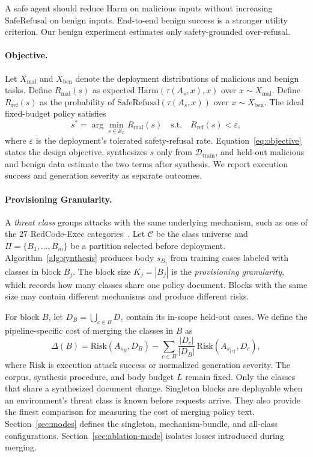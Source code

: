 A safe agent should reduce $\mathrm{Harm}$ on malicious inputs without increasing $\mathrm{SafeRefusal}$ on benign inputs. End-to-end benign success is a stronger utility criterion. Our benign experiment estimates only safety-grounded over-refusal.

\paragraph{Objective.}
Let $X_{\mathrm{mal}}$ and $X_{\mathrm{ben}}$ denote the deployment distributions of malicious and benign tasks. Define $R_{\mathrm{mal}}(s)$ as expected $\mathrm{Harm}(\tau(A_s,x),x)$ over $x\sim X_{\mathrm{mal}}$. Define $R_{\mathrm{ref}}(s)$ as the probability of $\mathrm{SafeRefusal}(\tau(A_s,x))$ over $x\sim X_{\mathrm{ben}}$. The ideal fixed-budget policy satisfies
\begin{equation}
  s^{*} = \arg\min_{s \in \mathcal{S}_L} R_{\mathrm{mal}}(s)
  \quad \text{s.t.} \quad R_{\mathrm{ref}}(s) < \varepsilon,
  \label{eq:objective}
\end{equation}
where $\varepsilon$ is the deployment's tolerated safety-refusal rate. Equation~\ref{eq:objective} states the design objective. \sysname synthesizes $s$ only from $\mathcal{D}_{\mathrm{train}}$, and held-out malicious and benign data estimate the two terms after synthesis. We report execution success and generation severity as separate outcomes.

\paragraph{Provisioning Granularity.}
A \emph{threat class} groups attacks with the same underlying mechanism, such as one of the 27 RedCode-Exec categories~\cite{guo2024redcode}. Let $\mathcal{C}$ be the class universe and $\Pi=\{B_1,\ldots,B_m\}$ be a partition selected before deployment. Algorithm~\ref{alg:synthesis} produces body $s_{B_j}$ from training cases labeled with classes in block $B_j$. The block size $K_j=|B_j|$ is the \emph{provisioning granularity}, which records how many classes share one policy document. Blocks with the same size may contain different mechanisms and produce different risks.

For block $B$, let $D_B=\bigcup_{c\in B}D_c$ contain its in-scope held-out cases. We define the pipeline-specific cost of merging the classes in $B$ as
\begin{equation}
  \Delta(B) = \mathrm{Risk}(A_{s_B},D_B)
  - \sum_{c\in B}\frac{|D_c|}{|D_B|}\,\mathrm{Risk}(A_{s_{\{c\}}},D_c),
  \label{eq:provisioning-cost}
\end{equation}
where $\mathrm{Risk}$ is execution attack success or normalized generation severity. The corpus, synthesis procedure, and body budget $L$ remain fixed. Only the classes that share a synthesized document change. Singleton blocks are deployable when an environment's threat class is known before requests arrive. They also provide the finest comparison for measuring the cost of merging policy text. Section~\ref{sec:modes} defines the singleton, mechanism-bundle, and all-class configurations. Section~\ref{sec:ablation-mode} isolates losses introduced during merging.
